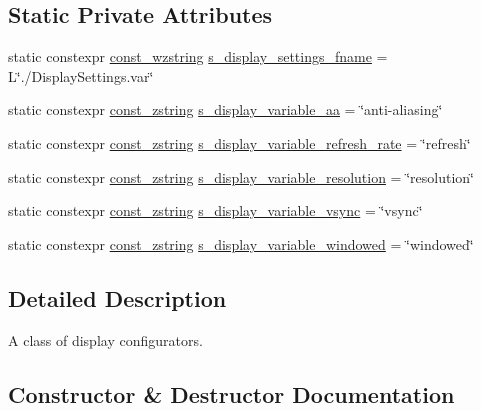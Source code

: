 \subsection*{Static Private Attributes}
\begin{DoxyCompactItemize}
\item 
static constexpr \hyperlink{namespacemage_ac409e0f2a22292a3a4cd42742994fbf0}{const\+\_\+wzstring} \hyperlink{classmage_1_1rendering_1_1_display_configurator_1_1_impl_a2ead8221b0659d05699de6ef4d3c0ba4}{s\+\_\+display\+\_\+settings\+\_\+fname} = L\char`\"{}./Display\+Settings.\+var\char`\"{}
\item 
static constexpr \hyperlink{namespacemage_abfd9206dc607ceb5d13ec68bf075a5c0}{const\+\_\+zstring} \hyperlink{classmage_1_1rendering_1_1_display_configurator_1_1_impl_a017dade5658f0a4fa0a56fec2fe30d52}{s\+\_\+display\+\_\+variable\+\_\+aa} = \char`\"{}anti-\/aliasing\char`\"{}
\item 
static constexpr \hyperlink{namespacemage_abfd9206dc607ceb5d13ec68bf075a5c0}{const\+\_\+zstring} \hyperlink{classmage_1_1rendering_1_1_display_configurator_1_1_impl_ae8cb7050d662cc3e5cd6ff97465517a6}{s\+\_\+display\+\_\+variable\+\_\+refresh\+\_\+rate} = \char`\"{}refresh\char`\"{}
\item 
static constexpr \hyperlink{namespacemage_abfd9206dc607ceb5d13ec68bf075a5c0}{const\+\_\+zstring} \hyperlink{classmage_1_1rendering_1_1_display_configurator_1_1_impl_af9c853047964698a8810e71bf4483a10}{s\+\_\+display\+\_\+variable\+\_\+resolution} = \char`\"{}resolution\char`\"{}
\item 
static constexpr \hyperlink{namespacemage_abfd9206dc607ceb5d13ec68bf075a5c0}{const\+\_\+zstring} \hyperlink{classmage_1_1rendering_1_1_display_configurator_1_1_impl_aee0b8c95b78b2e63655c3f294b56504b}{s\+\_\+display\+\_\+variable\+\_\+vsync} = \char`\"{}vsync\char`\"{}
\item 
static constexpr \hyperlink{namespacemage_abfd9206dc607ceb5d13ec68bf075a5c0}{const\+\_\+zstring} \hyperlink{classmage_1_1rendering_1_1_display_configurator_1_1_impl_a9d3c183714f56deaa9e55160c478bb27}{s\+\_\+display\+\_\+variable\+\_\+windowed} = \char`\"{}windowed\char`\"{}
\end{DoxyCompactItemize}


\subsection{Detailed Description}
A class of display configurators. 

\subsection{Constructor \& Destructor Documentation}
\hypertarget{classmage_1_1rendering_1_1_display_configurator_1_1_impl_af2385f84a5d80cf92a1d6afe2343a872}{}\label{classmage_1_1rendering_1_1_display_configurator_1_1_impl_af2385f84a5d80cf92a1d6afe2343a872} 

